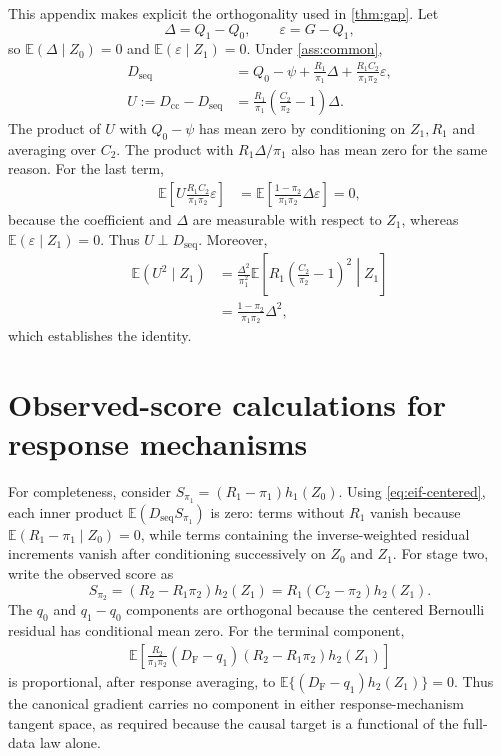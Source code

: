 \documentclass[11pt]{article}
\theoremstyle{definition}
\newcommand{\E}{\mathbb{E}}
\newcommand{\1}{\mathbf{1}}
\newcommand{\cc}{\mathrm{cc}}
\newcommand{\seq}{\mathrm{seq}}
\newcommand{\F}{\mathrm{F}}
\begin{document}
This appendix makes explicit the orthogonality used in \cref{thm:gap}. Let
\[
\Delta=Q_1-Q_0,\qquad \varepsilon=G-Q_1,
\]
so $\E(\Delta\mid Z_0)=0$ and $\E(\varepsilon\mid Z_1)=0$. Under \cref{ass:common},
\begin{align*}
D_{\seq}&=Q_0-\psi+\frac{R_1}{\pi_1}\Delta
+\frac{R_1C_2}{\pi_1\pi_2}\varepsilon,\\
U:=D_{\cc}-D_{\seq}
&=\frac{R_1}{\pi_1}\left(\frac{C_2}{\pi_2}-1\right)\Delta.
\end{align*}
The product of $U$ with $Q_0-\psi$ has mean zero by conditioning on $Z_1,R_1$ and averaging over $C_2$. The product with $R_1\Delta/\pi_1$ also has mean zero for the same reason. For the last term,
\begin{align*}
\E\!\left[
U\frac{R_1C_2}{\pi_1\pi_2}\varepsilon
\right]
&=\E\!\left[
\frac{1-\pi_2}{\pi_1\pi_2}\Delta\varepsilon
\right]=0,
\end{align*}
because the coefficient and $\Delta$ are measurable with respect to $Z_1$, whereas $\E(\varepsilon\mid Z_1)=0$. Thus $U\perp D_{\seq}$. Moreover,
\begin{align*}
\E(U^2\mid Z_1)
&=\frac{\Delta^2}{\pi_1^2}
\E\!\left[R_1\left(\frac{C_2}{\pi_2}-1\right)^2\middle|Z_1\right]\\
&=\frac{1-\pi_2}{\pi_1\pi_2}\Delta^2,
\end{align*}
which establishes the identity.

\section{Observed-score calculations for response mechanisms}\label{app:scores}

For completeness, consider $S_{\pi_1}=(R_1-\pi_1)h_1(Z_0)$. Using \cref{eq:eif-centered}, each inner product $\E(D_{\seq}S_{\pi_1})$ is zero: terms without $R_1$ vanish because $\E(R_1-\pi_1\mid Z_0)=0$, while terms containing the inverse-weighted residual increments vanish after conditioning successively on $Z_0$ and $Z_1$. For stage two, write the observed score as
\[
S_{\pi_2}=(R_2-R_1\pi_2)h_2(Z_1)=R_1(C_2-\pi_2)h_2(Z_1).
\]
The $q_0$ and $q_1-q_0$ components are orthogonal because the centered Bernoulli residual has conditional mean zero. For the terminal component,
\begin{align*}
\E\!\left[
\frac{R_2}{\pi_1\pi_2}(D_{\F}-q_1)
(R_2-R_1\pi_2)h_2(Z_1)
\right]
\end{align*}
is proportional, after response averaging, to
$\E\{(D_{\F}-q_1)h_2(Z_1)\}=0$. Thus the canonical gradient carries no component in either response-mechanism tangent space, as required because the causal target is a functional of the full-data law alone.
\end{document}
